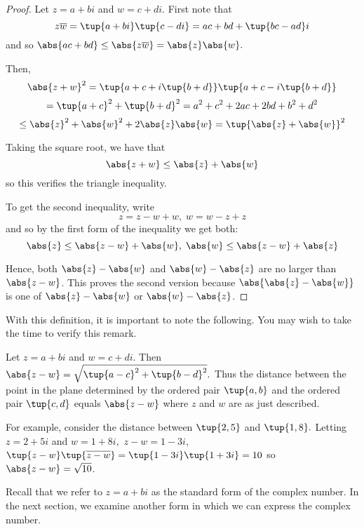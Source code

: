 \begin{proof}
Let $z=a+bi$ and $w=c+di$. First note that
\begin{equation*}
z
\overline{w}=\tup{a+bi} \tup{c-di} =ac+bd+\tup{
bc-ad}i
\end{equation*}
and so $\abs{ac+bd}\leq \abs{z\overline{w}}=\abs{z}\abs{w}.$

Then,
\begin{equation*}
\abs{z+w}^{2}=\tup{a+c+i\tup{b+d} } \tup{
a+c-i\tup{b+d} }
\end{equation*}
\begin{equation*}
=\tup{a+c} ^{2}+\tup{b+d}
^{2}=a^{2}+c^{2}+2ac+2bd+b^{2}+d^{2}
\end{equation*}
\begin{equation*}
\leq \abs{z}^{2}+\abs{w}^{2}+2\abs{z}\abs{w}=\tup{\abs{z}+\abs{w}} ^{2}
\end{equation*}

Taking the square root, we have that 
\begin{equation*}
\abs{z+w}\leq \abs{z}+\abs{w}
\end{equation*}
so this verifies the triangle inequality. 

To get the  second inequality, write
\begin{equation*}
z=z-w+w,\;w=w-z+z
\end{equation*}
and so by the first form of the inequality we get both:
\begin{equation*}
\abs{z}\leq \abs{z-w}+\abs{w},\;\abs{w}\leq \abs{z-w}+\abs{z}\end{equation*}

Hence,  both $\abs{z}-\abs{w}$ and 
$\abs{w}-\abs{z}$ are no larger than 
$\abs{z-w}$. This proves the second version because 
$\abs{\abs{z}-\abs{w}}$ is
one of $\abs{z}-\abs{w}$ or $\abs{w}-\abs{z}$. 
\end{proof}

With this definition, it is important to note the following. You may wish to take
the time to verify this remark.

Let $z=a+bi$ and $w=c+di.$ Then $\abs{z-w} =\sqrt{\tup{
a-c} ^{2}+\tup{b-d} ^{2}}.$ Thus the distance between the
point in the plane determined by the ordered pair $\tup{a,b} $ and
the ordered pair $\tup{c,d} $ equals $\abs{z-w} $ where $z$
and $w$ are as just described.

For example, consider the distance between $\tup{2,5} $ and $\tup{
1,8} .$ Letting $z=2+5i$ and $w=1+8i,$ $z-w=1-3i$, $\tup{z-w}
\tup{\overline{z-w}} =\tup{1-3i} \tup{1+3i}
= 10$ so $\abs{z-w}=\sqrt{10}$.

Recall that we refer to $z=a+bi$ as the standard form of the complex number. In the next section, 
we examine another form in which we can express the complex number. 
